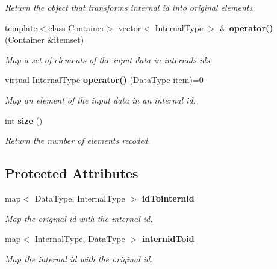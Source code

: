 \begin{CompactItemize}
\begin{CompactList}\small\item\em Return the object that transforms internal id into original elements. \item\end{CompactList}\item 
template$<$class Container$>$ vector$<$ Internal\-Type $>$ \& {\bf operator()} (Container \&itemset)
\begin{CompactList}\small\item\em Map a set of elements of the input data in internals ids. \item\end{CompactList}\item 
virtual Internal\-Type {\bf operator()} (Data\-Type item)=0
\begin{CompactList}\small\item\em Map an element of the input data in an internal id. \item\end{CompactList}\item 
int {\bf size} ()\label{class_recode_c551bb104645514d89da76a08c760fcb}

\begin{CompactList}\small\item\em Return the number of elements recoded. \item\end{CompactList}\end{CompactItemize}
\subsection*{Protected Attributes}
\begin{CompactItemize}
\item 
map$<$ Data\-Type, Internal\-Type $>$ {\bf id\-Tointernid}\label{class_recode_8b20ffccdf7b8c5e01f096ed7a7f0769}

\begin{CompactList}\small\item\em Map the original id with the internal id. \item\end{CompactList}\item 
map$<$ Internal\-Type, Data\-Type $>$ {\bf internid\-Toid}\label{class_recode_f2e010c315a3b441f9e21b1b91264c55}

\begin{CompactList}\small\item\em Map the internal id with the original id. \item\end{CompactList}\end{CompactItemize}


